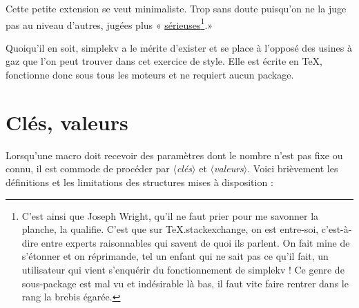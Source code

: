 \documentclass[french,a4paper,10pt]{article}
\makeatletter
\def\longfrhlstdate@i#1/#2/#3\@nil{\number#3\relax\space \ifcase#2 \or janvier\or février\or mars\or avril\or mai\or juin\or juillet\or aout\or septembre\or octobre\or novembre\or décembre\fi\space#1}
\edef\longfrhlstdate{\expandafter\longfrhlstdate@i\skvdate\@nil}
\def\<#1>{$\langle$\textit{#1}$\rangle$}
\makeatother
\begin{document}
\parindent=0pt
\thispagestyle{empty}

Cette petite extension se veut minimaliste. Trop sans doute puisqu'on ne la juge pas au niveau d'autres, jugées plus « \href{https://tex.stackexchange.com/questions/560014/}{sérieuses}\footnote{C'est ainsi que Joseph Wright, qu'il ne faut prier pour me savonner la planche, la qualifie. C'est que sur TeX.stackexchange, on est entre-soi, c'est-à-dire entre experts raisonnables qui savent de quoi ils parlent. On fait mine de s'étonner et on réprimande, tel un enfant qui ne sait pas ce qu'il fait, un utilisateur qui vient s'enquérir du fonctionnement de simplekv ! Ce genre de sous-package est mal vu et indésirable là bas, il faut vite faire rentrer dans le rang la brebis égarée.}.»

Quoiqu'il en soit, simplekv a le mérite d'exister et se place à l'opposé des usines à gaz que l'on peut trouver dans cet exercice de style. Elle est écrite en \TeX{}, fonctionne donc sous tous les moteurs et ne requiert aucun package.

\section{Clés, valeurs}
Lorsqu'une macro doit recevoir des paramètres dont le nombre n'est pas fixe ou connu, il est commode de procéder par \<clés> et \<valeurs>.
\medskip
Voici brièvement les définitions et les limitations des structures mises à disposition :
\end{document}
